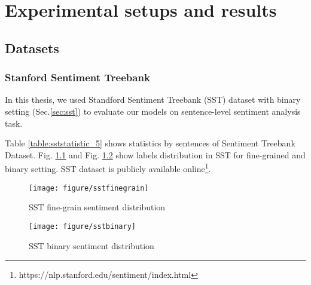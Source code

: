 \hypertarget{chap:result}{\chapter{Experimental setups and results}}\label{result-discuss}
\section{Datasets}
\subsection{Stanford Sentiment Treebank}
In this thesis, we used Standford Sentiment Treebank (SST) dataset with binary setting (Sec.\ref{sec:sst}) to evaluate our models on sentence-level sentiment analysis task.

Table \ref{table:sststatistic_5} shows statistics by sentences of Sentiment Treebank Dataset. Fig. \ref{fig:sstfinegrain_5} and Fig. \ref{fig:sstbinary_5} show labels distribution in SST for fine-grained and binary setting.
SST dataset is publicly available online\footnote{https://nlp.stanford.edu/sentiment/index.html}.

\begin{figure}[H]
    \begin{minipage}{\textwidth}
        \centering
        \texttt{[image: figure/sstfinegrain]}
        \caption[SST fine-grain sentiment distribution]{SST fine-grain sentiment distribution}
        \label{fig:sstfinegrain_5}
    \end{minipage}
\end{figure}

\begin{figure}[H]
    \begin{minipage}{\textwidth}
        \centering
        \texttt{[image: figure/sstbinary]}
        \caption[SST binary sentiment distribution]{SST binary sentiment distribution}
        \label{fig:sstbinary_5}
    \end{minipage}
\end{figure}

